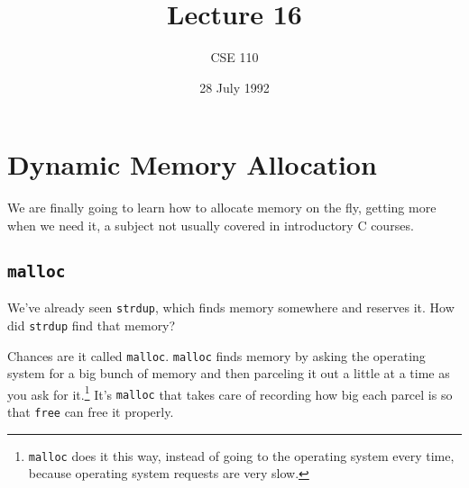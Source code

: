 %
%
%


\def\brac#1{$<${#1}$>$}
\def\Int{{\tt int}}
\def\int{\brac{\Int}}
\def\int{\brac{\Int}}
\def\Shortint{{\tt short~int}}
\def\shortint{\brac{\Shortint}}
\def\Longint{{\tt long~int}}
\def\longint{\brac{\Longint}}
\def\Float{{\tt float}}
\def\float{\brac{\Float}}
\def\Double{{\tt double}}
\def\double{\brac{\Double}}
\def\Char{{\tt char}}
\def\chr{\brac{\Char}}
\def\Void{{\tt void}}
\def\void{\brac{\Void}}

\def\ptr#1{pointer~to {#1}}
\def\p2#1{\brac{\ptr{#1}}}
\def\Ano#1#2{array~of {#1}~{#2}s}
\def\ano#1#2{\brac{\Ano{#1}{#2}}}
\def\Ao#1{array~of {#1}}
\def\ao#1{\brac{\Ao#1}}

\def\np{{\tt NULL} pointer}

\def\breakhere{\mbox{$\otimes$}}


\title{Lecture 16}
\author{CSE 110}
\date{28 July 1992}

\parskip 8pt

\pagestyle{fancy}
\rhead{\thepage}
\cfoot{}




\maketitle

\section{Dynamic Memory Allocation}

We are finally going to learn how to allocate memory on the fly, getting
more when we need it, a subject not usually covered in introductory C
courses.

\subsection{{\tt malloc}}

We've already seen {\tt strdup}, which finds memory somewhere and
reserves it.  How did {\tt strdup} find that memory?

Chances are it called {\tt malloc}.  {\tt malloc} finds memory by asking
the operating system for a big bunch of memory and then parceling it out
a little at a time as you ask for it.\footnote{{\tt malloc} does it this
way, instead of going to the operating system every time, because
operating system requests are very slow.} It's {\tt malloc} that takes
care of recording how big each parcel is so that {\tt free} can free it
properly.

